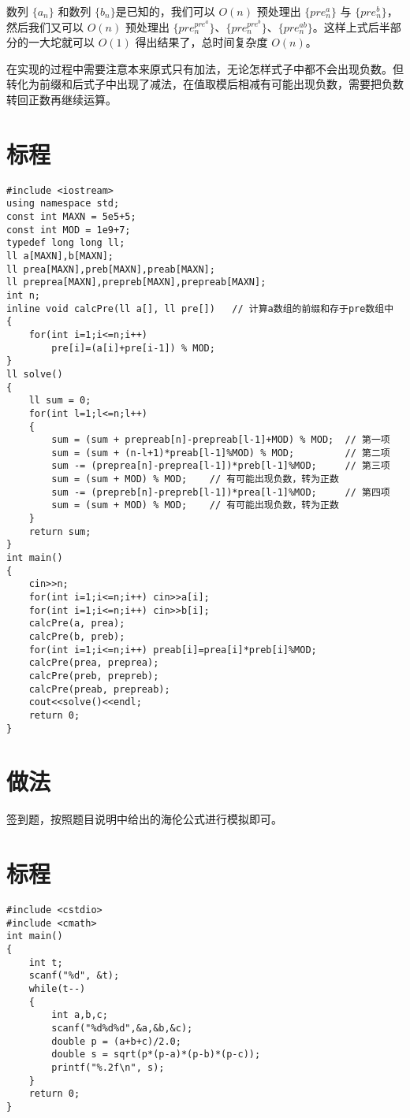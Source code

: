 \documentclass{ctsol}
\begin{document}
数列 $\{a_n\}$ 和数列 $\{b_n\}$是已知的，我们可以 $O(n)$ 预处理出 $\{pre^a_n\}$ 与 $\{pre^b_n\}$，然后我们又可以 $O(n)$ 预处理出 $\{pre^{pre^a}_n\}$、$\{pre^{pre^b}_n\}$、$\{pre^{ab}_n\}$。这样上式后半部分的一大坨就可以 $O(1)$ 得出结果了，总时间复杂度 $O(n)$。

在实现的过程中需要注意本来原式只有加法，无论怎样式子中都不会出现负数。但转化为前缀和后式子中出现了减法，在值取模后相减有可能出现负数，需要把负数转回正数再继续运算。

\section*{标程}
\begin{lstlisting}
#include <iostream>
using namespace std;
const int MAXN = 5e5+5;
const int MOD = 1e9+7;
typedef long long ll;
ll a[MAXN],b[MAXN];
ll prea[MAXN],preb[MAXN],preab[MAXN];
ll preprea[MAXN],prepreb[MAXN],prepreab[MAXN];
int n;
inline void calcPre(ll a[], ll pre[])   // 计算a数组的前缀和存于pre数组中
{
    for(int i=1;i<=n;i++)
        pre[i]=(a[i]+pre[i-1]) % MOD;
}
ll solve()
{
    ll sum = 0;
    for(int l=1;l<=n;l++)
    {
        sum = (sum + prepreab[n]-prepreab[l-1]+MOD) % MOD;  // 第一项
        sum = (sum + (n-l+1)*preab[l-1]%MOD) % MOD;         // 第二项
        sum -= (preprea[n]-preprea[l-1])*preb[l-1]%MOD;     // 第三项
        sum = (sum + MOD) % MOD;    // 有可能出现负数，转为正数
        sum -= (prepreb[n]-prepreb[l-1])*prea[l-1]%MOD;     // 第四项
        sum = (sum + MOD) % MOD;    // 有可能出现负数，转为正数
    }
    return sum;
}
int main()
{
    cin>>n;
    for(int i=1;i<=n;i++) cin>>a[i];
    for(int i=1;i<=n;i++) cin>>b[i];
    calcPre(a, prea);
    calcPre(b, preb);
    for(int i=1;i<=n;i++) preab[i]=prea[i]*preb[i]%MOD;
    calcPre(prea, preprea);
    calcPre(preb, prepreb);
    calcPre(preab, prepreab);
    cout<<solve()<<endl;
    return 0;
}
\end{lstlisting}

\makesolution
\section*{做法}
签到题，按照题目说明中给出的海伦公式进行模拟即可。

\section*{标程}
\begin{lstlisting}
#include <cstdio>
#include <cmath>
int main()
{
    int t;
    scanf("%d", &t);
    while(t--)
    {
        int a,b,c;
        scanf("%d%d%d",&a,&b,&c);
        double p = (a+b+c)/2.0;
        double s = sqrt(p*(p-a)*(p-b)*(p-c));
        printf("%.2f\n", s);
    }
    return 0;
}
\end{lstlisting}
\end{document}
